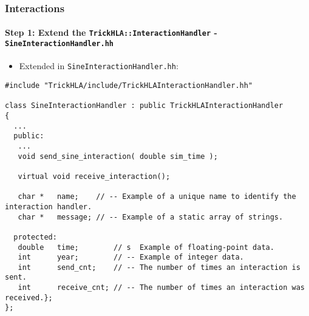    \begin{frame}[fragile]
      \frametitle{Interactions}
      \framesubtitle{Step 1: Extend the \texttt{TrickHLA::InteractionHandler} - \texttt{SineInteractionHandler.hh}}
      \begin{itemize}
         \item Extended in \texttt{SineInteractionHandler.hh}:
      \end{itemize}
      \vspace{0.2cm}
\begin{Verbatim}[frame=single, fontsize=\tiny]
#include "TrickHLA/include/TrickHLAInteractionHandler.hh"

class SineInteractionHandler : public TrickHLAInteractionHandler
{
  ...
  public:
   ...
   void send_sine_interaction( double sim_time );

   virtual void receive_interaction();

   char *   name;    // -- Example of a unique name to identify the interaction handler.
   char *   message; // -- Example of a static array of strings.

  protected:
   double   time;        // s  Example of floating-point data.
   int      year;        // -- Example of integer data.
   int      send_cnt;    // -- The number of times an interaction is sent.
   int      receive_cnt; // -- The number of times an interaction was received.};
};
\end{Verbatim}
   \end{frame}


